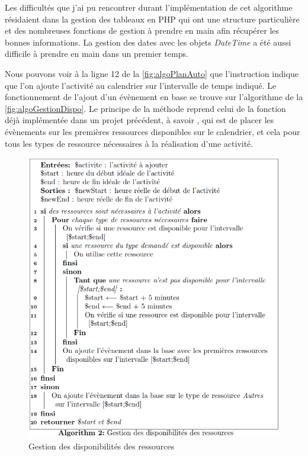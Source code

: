 \documentclass[noposter]{polytech/polytech}
\begin{document}
Les difficultés que j'ai pu rencontrer durant l'implémentation de cet algorithme résidaient dans la gestion des tableaux en PHP qui ont une structure particulière et des nombreuses fonctions de gestion à prendre en main afin récupérer les bonnes informations. La gestion des dates avec les objets \textit{DateTime} a été aussi difficile à prendre en main dans un premier temps.  

Nous pouvons voir à la ligne 12 de la \autoref{fig:algoPlanAuto} que l'instruction indique que l'on ajoute l'activité au calendrier sur l'intervalle de temps indiqué. Le fonctionnement de l'ajout d'un évènement en base se trouve sur l'algorithme de la \autoref{fig:algoGestionDispo}. Le principe de la méthode reprend celui de la fonction déjà implémentée dans un projet précédent, à savoir , qui est de placer les évènements sur les premières ressources disponibles sur le calendrier, et cela pour tous les types de ressource nécessaires à la réalisation d'une activité. 

\begin{figure}
	\includegraphics[scale=0.85]{images/algoGestionDispo}
	\caption{Gestion des disponibilités des ressources}
	\label{fig:algoGestionDispo}
\end{figure}
\end{document}

